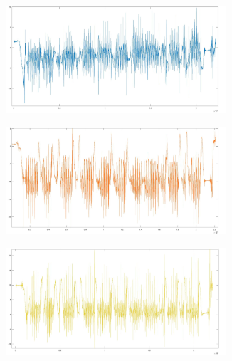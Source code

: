 \documentclass[a4paper]{article}
\begin{document}
\begin{minipage}{\linewidth}
\begin{center}
\includegraphics[width=154mm, height= 40mm]{./images/registrazione_tesi/acc_phX.jpg} 
\end{center}
\end{minipage}
\makebox[\linewidth]{}

\begin{minipage}{\linewidth}
\begin{center}
\includegraphics[width=154mm, height= 40mm]{./images/registrazione_tesi/acc_phY.jpg} 
\end{center}
\end{minipage}
\makebox[\linewidth]{}

\begin{minipage}{\linewidth}
\begin{center}
\includegraphics[width=154mm, height= 40mm]{./images/registrazione_tesi/acc_phZ.jpg} 
\end{center}
\end{minipage}
\makebox[\linewidth]{}
\end{document}
